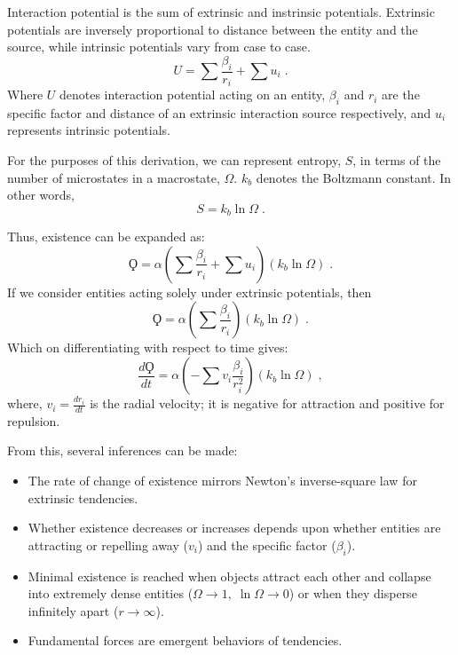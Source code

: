 \documentclass{article}
\begin{document}
Interaction potential is the sum of extrinsic and instrinsic potentials.
Extrinsic potentials are inversely proportional to distance between the entity and the source, while intrinsic potentials vary from case to case.
\begin{equation*}
    U = \sum \frac{\beta_{i}}{r_{i}} + \sum u_{i}\;.
\end{equation*}
Where $U$ denotes interaction potential acting on an entity, $\beta_{i}$ and $r_{i}$ are the specific factor and distance of an extrinsic interaction source respectively, and $u_{i}$ represents intrinsic potentials.

For the purposes of this derivation, we can represent entropy, $S$, in terms of the number of microstates in a macrostate, $\Omega$. $k_{b}$ denotes the Boltzmann constant. 
In other words,
\begin{equation*}
    S = k_{b} \ln \Omega\;.
\end{equation*}

Thus, existence can be expanded as:
\begin{equation*}
    \Koppa = \alpha \left( \sum \frac{\beta_{i}}{r_{i}} + \sum u_{i} \right) \left( k_{b} \ln \Omega \right)\;.
\end{equation*}
If we consider entities acting solely under extrinsic potentials, then 
\begin{equation*}
    \Koppa = \alpha \left( \sum \frac{\beta_{i}}{r_{i}} \right) \left( k_{b} \ln \Omega \right)\;.
\end{equation*}
Which on differentiating with respect to time gives:
\begin{equation*}
    \frac{d\Koppa}{dt} = \alpha \left( -\sum v_{i}\frac{\beta_{i}}{r^2_{i}} \right) \left( k_{b} \ln \Omega \right)\;,
\end{equation*}
where, $v_i = \frac{dr_i}{dt}$ is the radial velocity; it is negative for attraction and positive for repulsion.

From this, several inferences can be made:

\begin{itemize}
    \item The rate of change of existence mirrors Newton's inverse-square law for extrinsic tendencies.
    \item Whether existence decreases or increases depends upon whether entities are attracting or repelling away ($v_{i}$) and the specific factor ($\beta_{i}$).
    \item Minimal existence is reached when objects attract each other and collapse into extremely dense entities ($ \Omega \rightarrow 1,\; \ln \Omega \rightarrow 0$) or when they disperse infinitely apart ($r \rightarrow \infty$).
    \item Fundamental forces are emergent behaviors of tendencies.
\end{itemize}
\end{document}
